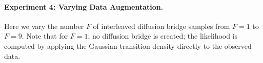 \documentclass{article}
\begin{document}
\paragraph{Experiment 4: Varying Data Augmentation.} 
Here we vary the number $F$ of interleaved diffusion bridge samples from $F=1$ to $F=9$.  Note that for $F=1$, no diffusion bridge is created; the likelihood is computed by applying the Gaussian transition density directly to the observed data.

{\small


}
\end{document}
